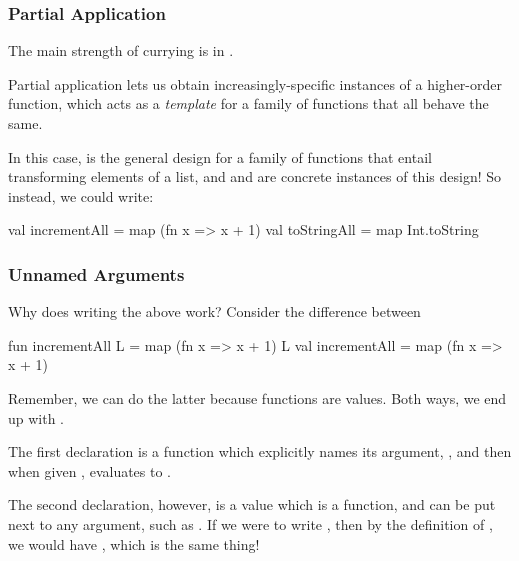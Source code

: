 \documentclass[aspectratio=169]{beamer}
\begin{document}
\begin{frame}[fragile]
  \frametitle{Partial Application}

  The main strength of currying is in .

  \pause
  \vspace{\fill}


  \pause
  \vspace{\fill}

  Partial application lets us obtain increasingly-specific instances of a higher-order
  function, which acts as a \textit{template} for a family of functions that all behave
  the same.

  \pause
  \vspace{\fill}

  In this case,  is the general design for a family of functions that entail
  transforming elements of a list, and  and  are
  concrete instances of this design! So instead, we could write:

  \pause
  \begin{codeblock}
    val incrementAll = map (fn x => x + 1)
    val toStringAll = map Int.toString
  \end{codeblock}
\end{frame}

\begin{frame}[fragile]
  \frametitle{Unnamed Arguments}

  Why does writing the above work? Consider the difference between
  \begin{codeblock}
    fun incrementAll L = map (fn x => x + 1) L
    val incrementAll = map (fn x => x + 1)
  \end{codeblock}

  \pause
  \vspace{\fill}

  Remember, we can do the latter because functions are values. Both ways,
  we end up with .

  \pause
  \vspace{\fill}

  The first declaration is a function which explicitly names its argument,
  , and then when given , evaluates to .

  \pause
  \vspace{\fill}

  The second declaration, however, is a value which is a function, and can
  be put next to any argument, such as . If we were to write
  , then by the definition of ,
  we would have , which is the same thing!
\end{frame}
\end{document}
